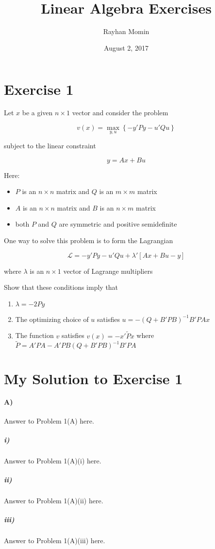 \documentclass[10pt,letter]{article}
\begin{document}


\title{Linear Algebra Exercises}

\author{Rayhan Momin}

\date{August 2, 2017}
 
\maketitle 

\section*{Exercise 1}

\begin{flushleft}
Let $x$ be a given $n \times 1$ vector and consider the problem


\[v(x) =  \max_{y,u} \left\{ - y'P y - u' Q u \right\}\]


subject to the linear constraint


\[y = Ax + Bu\]


Here: 


\begin{itemize}
  \item $P$ is an $n \times n$ matrix and $Q$ is an $m \times m$ matrix
  \item $A$ is an $n \times n$ matrix and $B$ is an $n \times m$ matrix
  \item both $P$ and $Q$ are symmetric and positive semidefinite
\end{itemize}


One way to solve this problem is to form the Lagrangian


\[\mathcal L = - y' P y - u' Q u + \lambda' \left[A x + B u - y\right]\]


where $\lambda$ is an $n \times 1$ vector of Lagrange multipliers

Show that these conditions imply that

\begin{enumerate}
\item $\lambda = -2Py$
\item The optimizing choice of $u$ satisfies $u = - (Q + B' P B)^{-1} B' P A x$
\item The function $v$ satisfies $v(x) = - x' \tilde P x$ where $\tilde P = A' P A - A'P B (Q + B'P B)^{-1} B' P A$
\end{enumerate}

\end{flushleft}
\section*{My Solution to Exercise 1}

\paragraph{A)} Answer to Problem 1(A) here.

\subparagraph{i)} Answer to Problem 1(A)(i) here.

\subparagraph{ii)} Answer to Problem 1(A)(ii) here.

\subparagraph{iii)} Answer to Problem 1(A)(iii) here.
\end{document}
